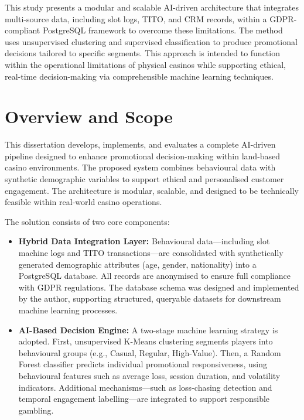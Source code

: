 \documentclass[12pt,a4paper]{report}
\begin{document}
 This study presents a modular and scalable AI-driven architecture that integrates multi-source data, including slot logs, TITO, and CRM records, within a GDPR-compliant PostgreSQL framework to overcome these limitations.  The method uses unsupervised clustering and supervised classification to produce promotional decisions tailored to specific segments.  This approach is intended to function within the operational limitations of physical casinos while supporting ethical, real-time decision-making via comprehensible machine learning techniques.


\section{Overview and Scope}

This dissertation develops, implements, and evaluates a complete AI-driven pipeline designed to enhance promotional decision-making within land-based casino environments. The proposed system combines behavioural data with synthetic demographic variables to support ethical and personalised customer engagement. The architecture is modular, scalable, and designed to be technically feasible within real-world casino operations.

The solution consists of two core components:

\begin{itemize}
    \item \textbf{Hybrid Data Integration Layer:} Behavioural data—including slot machine logs and TITO transactions—are consolidated with synthetically generated demographic attributes (age, gender, nationality) into a PostgreSQL database. All records are anonymised to ensure full compliance with GDPR regulations. The database schema was designed and implemented by the author, supporting structured, queryable datasets for downstream machine learning processes.
    
    \item \textbf{AI-Based Decision Engine:} A two-stage machine learning strategy is adopted. First, unsupervised K-Means clustering segments players into behavioural groups (e.g., Casual, Regular, High-Value). Then, a Random Forest classifier predicts individual promotional responsiveness, using behavioural features such as average loss, session duration, and volatility indicators. Additional mechanisms—such as loss-chasing detection and temporal engagement labelling—are integrated to support responsible gambling.
\end{itemize}
\end{document}
